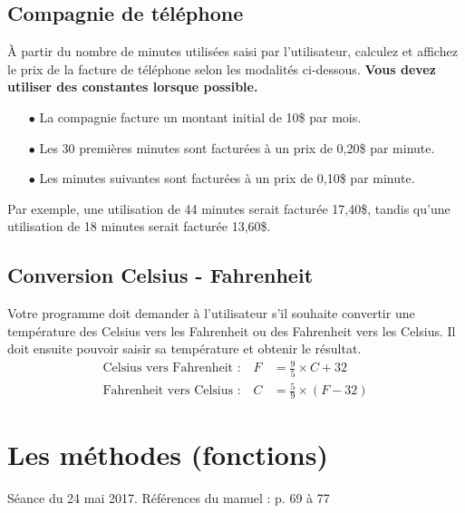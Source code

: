 \documentclass[12pt]{article}
\begin{document}
% 
%
%

\subsection{Compagnie de téléphone}

À partir du nombre de minutes utilisées saisi par l’utilisateur, calculez et affichez le prix de la facture de téléphone selon les modalités ci-dessous. \textbf{Vous devez utiliser des constantes lorsque possible.}

\begin{itemize}
	\item[$\bullet$] La compagnie facture un montant initial de 10\$ par mois.
	\item[$\bullet$] Les 30 premières minutes sont facturées à un prix de 0,20\$ par minute.
	\item[$\bullet$] Les minutes suivantes sont facturées à un prix de 0,10\$ par minute.
\end{itemize}

Par exemple, une utilisation de 44 minutes serait facturée 17,40\$, tandis qu'une utilisation de 18 minutes serait facturée 13,60\$.

%
%
%
%

\subsection{Conversion Celsius - Fahrenheit}

Votre programme doit demander à l'utilisateur s'il souhaite convertir une température des Celsius vers les Fahrenheit ou des Fahrenheit vers les Celsius. Il doit ensuite pouvoir saisir sa température et obtenir le résultat.
%
\begin{align*}
	\text{Celsius vers Fahrenheit :} \quad F &= \frac{9}{5} \times C + 32\\[5pt]
	\text{Fahrenheit vers Celsius :} \quad C &= \frac{5}{9} \times (F - 32)
\end{align*}


%
%

\section{Les méthodes (fonctions)}
\vspace*{-\baselineskip}
Séance du 24 mai 2017. Références du manuel : p. 69 à 77
\end{document}
